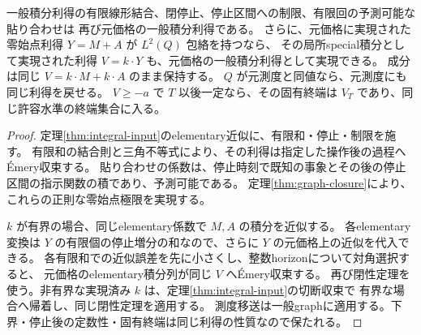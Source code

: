\begin{corollary}[元市場での取引操作]\label{cor:market-operations}
一般積分利得の有限線形結合、閉停止、停止区間への制限、有限回の予測可能な貼り合わせは
再び元価格の一般積分利得である。
さらに、元価格に実現された零始点利得 $Y=M+A$ が $L^2(Q)$ 包絡を持つなら、
その局所special積分として実現された利得 $V=k\cdot Y$ も、元価格の一般積分利得として実現できる。
成分は同じ $V=k\cdot M+k\cdot A$ のまま保持する。
$Q$ が元測度と同値なら、元測度にも同じ利得を戻せる。
$V\geq-a$ で $T$ 以後一定なら、その固有終端は $V_T$ であり、同じ許容水準の終端集合に入る。
\end{corollary}
\begin{proof}
定理\ref{thm:integral-input}のelementary近似に、有限和・停止・制限を施す。
有限和の結合則と三角不等式により、その利得は指定した操作後の過程へÉmery収束する。
貼り合わせの係数は、停止時刻で既知の事象とその後の停止区間の指示関数の積であり、予測可能である。
定理\ref{thm:graph-closure}により、これらの正則な零始点極限を実現する。

$k$ が有界の場合、同じelementary係数で $M,A$ の積分を近似する。
各elementary変換は $Y$ の有限個の停止増分の和なので、さらに $Y$ の元価格上の近似を代入できる。
各有限和での近似誤差を先に小さくし、整数horizonについて対角選択すると、
元価格のelementary積分列が同じ $V$ へÉmery収束する。
再び閉性定理を使う。非有界な実現済み $k$ は、定理\ref{thm:integral-input}の切断収束で
有界な場合へ帰着し、同じ閉性定理を適用する。
測度移送は一般graphに適用する。下界・停止後の定数性・固有終端は同じ利得の性質なので保たれる。
\end{proof}

